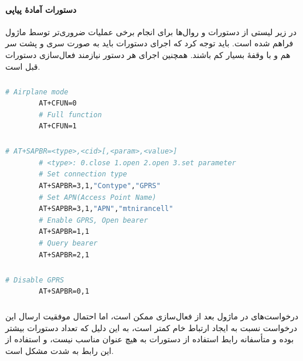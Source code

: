 \paragraph{دستورات آمادهٔ پیاپی}\label{par4:subsubsec1:subsec1:sec2:chap5}

در زیر لیستی از دستورات و روال‌ها برای انجام برخی عملیات ضروری‌تر توسط ماژول فراهم شده است.
باید توجه کرد که اجرای دستورات باید به صورت سری و پشت سر هم و با وقفهٔ بسیار کم باشند.
همچنین اجرای هر دستور نیازمند فعال‌سازی دستورات قبل است.

\subparagraph{}\label{subpar1:par4:subsubsec1:subsec1:sec2:chap5}
\:\newline\:
\begin{latin}
	\small
	\begin{lstlisting}[language=bash,caption={restarting module}]
        # Airplane mode
        AT+CFUN=0
		# Full function
		AT+CFUN=1
	\end{lstlisting}
\end{latin}

\subparagraph{ }\label{subpar2:par1:subsubsec1:subsec1:sec2:chap5}
\:\newline\:
\begin{latin}
	\small
	\begin{lstlisting}[language=bash,caption={Enable GPRS}]
		# AT+SAPBR=<type>,<cid>[,<param>,<value>]
		# <type>: 0.close 1.open 2.open 3.set parameter
		# Set connection type
		AT+SAPBR=3,1,"Contype","GPRS"
		# Set APN(Access Point Name)
		AT+SAPBR=3,1,"APN","mtnirancell"
		# Enable GPRS, Open bearer
		AT+SAPBR=1,1
		# Query bearer
		AT+SAPBR=2,1
	\end{lstlisting}
\end{latin}

\subparagraph{ }\label{subpar3:par1:subsubsec1:subsec1:sec2:chap5}
\:\newline\:
\begin{latin}
	\small
	\begin{lstlisting}[language=bash,caption={Disabling GPRS}]
		# Disable GPRS
		AT+SAPBR=0,1
	\end{lstlisting}
\end{latin}

\subparagraph{ }\label{subpar4:par1:subsubsec1:subsec1:sec2:chap5}
\:\newline\:
درخواست‌های  در ماژول  بعد از فعال‌سازی  ممکن است، اما احتمال موفقیت ارسال این درخواست نسبت به ایجاد ارتباط خام  کمتر است،
به این دلیل که تعداد دستورات بیشتر بوده و متأسفانه رابط استفاده از دستورات به هیچ عنوان مناسب نیست، و استفاده از این رابط به شدت مشکل است.

